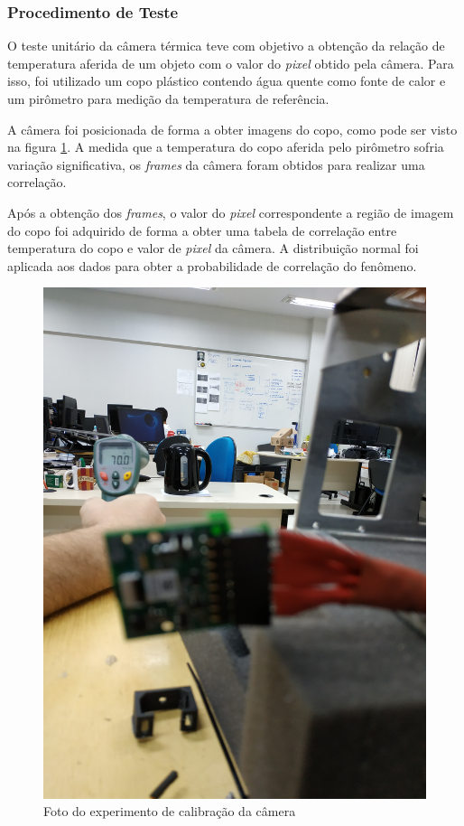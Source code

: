 		\subsubsection{Procedimento de Teste}
		
		O teste unitário da câmera térmica teve com objetivo a obtenção da relação de temperatura aferida de um objeto com o valor do \textit{pixel} obtido pela câmera. Para isso, foi utilizado um copo plástico contendo água quente como fonte de calor e um pirômetro para medição da temperatura de referência.
		
		 A câmera foi posicionada de forma a obter imagens do copo, como pode ser visto na figura \ref{fig:cameratest}. A medida que a temperatura do copo aferida pelo pirômetro sofria variação significativa, os \textit{frames} da câmera foram obtidos para realizar uma correlação. 
		 
		 Após a obtenção dos \textit{frames}, o valor do \textit{pixel} correspondente a região de imagem do copo foi adquirido de forma a obter uma tabela de correlação entre temperatura do copo e valor de \textit{pixel} da câmera. A distribuição normal foi aplicada aos dados para obter a probabilidade de correlação do fenômeno.
		 \pagebreak

		
		\begin{figure}[!ht]
		   \centering
		   \includegraphics[width=12cm]{Figures/testecamera.jpg}
		   \caption{Foto do experimento de calibração da câmera}
		   \label{fig:cameratest}
		\end{figure}
		
